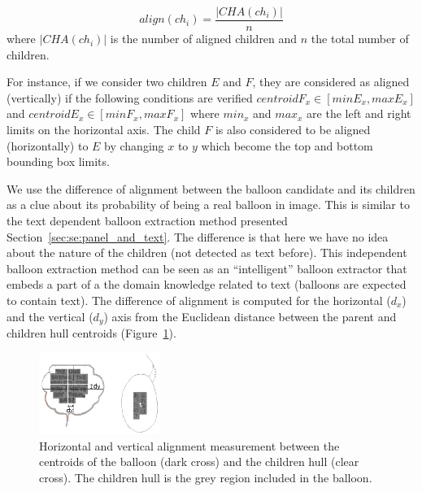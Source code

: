 \begin{equation}
	\label{eq:in:balloon_alignment}
	align(ch_i) = \frac{|CHA(ch_i)|}{n}
\end{equation}
where $|CHA(ch_i)|$ is the number of aligned children and $n$ the total number of children.


For instance, if we consider two children $E$ and $F$, they are considered as aligned (vertically) if the following conditions are verified $centroidF_x \in [minE_x, maxE_x]$ and $centroidE_x \in [minF_x, maxF_x]$ where $min_x$ and $max_x$ are the left and right limits on the horizontal axis.
The child $F$ is also considered to be aligned (horizontally) to $E$ by changing $x$ to $y$ which become the top and bottom bounding box limits.

We use the difference of alignment between the balloon candidate and its children as a clue about its probability of being a real balloon in image.
This is similar to the text dependent balloon extraction method presented Section~\ref{sec:se:panel_and_text}.
The difference is that here we have no idea about the nature of the children (not detected as text before).
This independent balloon extraction method can be seen as an ``intelligent'' balloon extractor that embeds a part of a the domain knowledge related to text (balloons are expected to contain text).
The difference of alignment is computed for the horizontal ($d_x$) and the vertical ($d_y$) axis from the Euclidean distance between the parent and children hull centroids (Figure~\ref{fig:in:coaxial_alignment}).


    \begin{figure}[ht]%
      \centering
      \includegraphics[trim= 0px 15px 80px 24px, clip, width=0.35\textwidth]{coaxial_alignment.png}
    \caption[Balloon content alignment measures]{Horizontal and vertical alignment measurement between the centroids of the balloon (dark cross) and the children hull (clear cross). The children hull is the grey region included in the balloon.}
    \label{fig:in:coaxial_alignment}
    \end{figure}

